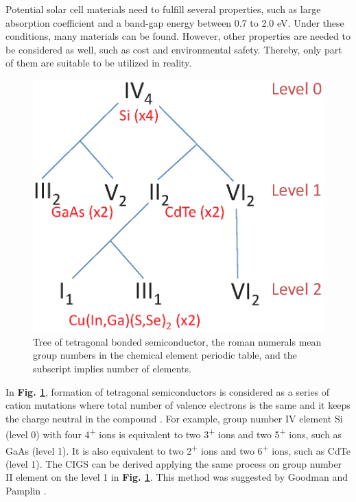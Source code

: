 \documentclass[a4paper, 12pt, titlepage,oneside,drop]{kthesis}
\begin{document}
Potential solar cell materials need to fulfill several properties, such as large absorption coefficient and a band-gap energy between 0.7 to 2.0 eV. Under these conditions, many materials can be found.
However, other properties are needed to be considered as well, such as cost and environmental safety. Thereby, only part of them are suitable to be utilized in reality.

\begin{figure}[H]
\centering
\includegraphics[scale=0.5]{tree.eps} 
\caption{Tree of tetragonal bonded semiconductor, the roman numerals mean group numbers in the chemical element periodic table, and the subscript implies number of elements.}
\label{lscm}
\end{figure}

In \textbf{Fig. \ref{lscm}}, formation of tetragonal semiconductors is considered as a series of cation mutations where total number of valence electrons is the same and it keeps the charge neutral in the compound \cite{chen2009electronic, chen2009crystal, walsh2009design}. For example, group number
IV element Si (level 0) with four 4\textsuperscript{+} ions is equivalent to two 3\textsuperscript{+} ions and two 5\textsuperscript{+} ions, such as GaAs (level 1). It is also equivalent to two 2\textsuperscript{+} ions
and two 6\textsuperscript{+} ions, such as CdTe (level 1). The CIGS can be derived applying the same process on group number II element on the level 1 in \textbf{Fig. \ref{lscm}}. This method was suggested by Goodman and Pamplin 
\cite{goodman1958prediction, pamplin1964systematic}. 
\end{document}
